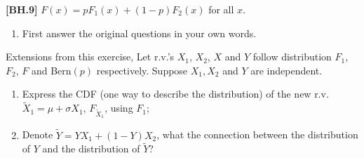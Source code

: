 \begin{exercise}
	\textbf{[BH.9]} $F(x) = p F_1(x)+ (1 - p) F_2(x)$ for all $x$.
	\begin{enumerate}
		\item First answer the original questions in your own words.
	\end{enumerate}
Extensions from this exercise, Let r.v.'s $X_1$, $X_2$, $X$ and $Y$ follow distribution $F_1$, $F_2$, $F$ and Bern$(p)$ respectively. Suppose $X_1,X_2$ and $Y$ are independent.
\begin{enumerate}
	\item Express the CDF (one way to describe the distribution) of the new r.v. $\tilde{X}_1=\mu+ \sigma X_1$, $F_{\tilde{X}_1}$, using $F_1$;
	\item Denote $\tilde{Y}=YX_1+(1-Y)X_2$, what the connection between the distribution of $Y$ and the distribution of $\tilde{Y}$?
\end{enumerate}
\end{exercise}
